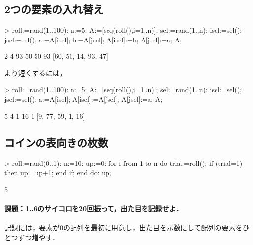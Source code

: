 \subsection{2つの要素の入れ替え}
\begin{MapleInput}
> roll:=rand(1..100): n:=5: A:=[seq(roll(),i=1..n)]; sel:=rand(1..n):
  isel:=sel(); 
  jsel:=sel(); 
  a:=A[isel]; b:=A[jsel]; A[isel]:=b; A[jsel]:=a; 
  A;
\end{MapleInput}
\begin{MapleError}
                      [60, 93, 14, 50, 47]
                               2
                               4
                               93
                               50
                               50
                               93
                      [60, 50, 14, 93, 47]
\end{MapleError}
より短くするには，
\begin{MapleInput}
> roll:=rand(1..100):
  n:=5:
  A:=[seq(roll(),i=1..n)];
  sel:=rand(1..n):
  isel:=sel();
  jsel:=sel();
  a:=A[isel];
  A[isel]:=A[jsel];
  A[jsel]:=a;
  A;
\end{MapleInput}
\begin{MapleError}
                       [9, 77, 59, 16, 1]
                               5
                               4
                               1
                               16
                               1
                       [9, 77, 59, 1, 16]
\end{MapleError}

\subsection{コインの表向きの枚数}
\begin{MapleInput}
> roll:=rand(0..1):
  n:=10:
  up:=0:
  for i from 1 to n do
    trial:=roll();
    if (trial=1) then 
      up:=up+1;
    end if;
  end do:
  up;
\end{MapleInput}
\begin{MapleError}
                                      5
\end{MapleError}

\paragraph{課題：1..6のサイコロを20回振って，出た目を記録せよ．}
記録には，要素が0の配列を最初に用意し，出た目を示数にして配列の要素をひとつずつ増やす．
